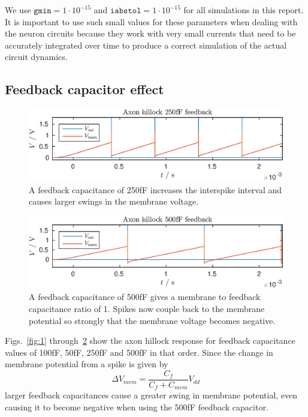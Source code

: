We use \(\texttt{gmin} = 1\cdot10^{-15}\) and \(\texttt{iabstol} = 1\cdot10^{-15}\) for all simulations in this report. It is important
to use such small values for these parameters when dealing with the neuron circuits because they work with very small currents that need
to be accurately integrated over time to produce a correct simulation of the actual circuit dynamics.

\subsection{Feedback capacitor effect}
\begin{figure}
    \center
    \includegraphics{fig3.eps}
    \caption{A feedback capacitance of 250fF increases the interspike interval and causes larger swings in the membrane voltage.}
    \label{fig:3}
\end{figure}
\begin{figure}
    \center
    \includegraphics{fig4.eps}
    \caption{A feedback capacitance of 500fF gives a membrane to feedback capacitance ratio of 1. Spikes now couple back to the membrane
    potential so strongly that the membrane voltage becomes negative.}
    \label{fig:4}
\end{figure}
Figs.~\ref{fig:1} through~\ref{fig:4} show the axon hillock response for feedback capacitance values of 100fF, 50fF, 250fF and 500fF in that order.
Since the change in membrane potential from a spike is given by
\begin{equation*}
    \Delta V_{mem} = \frac{C_{f}}{C_f+C_{mem}} V_{dd}
\end{equation*}
larger feedback capacitances cause a greater swing in membrane potential, even causing it to become negative when using the 500fF feedback capacitor.

